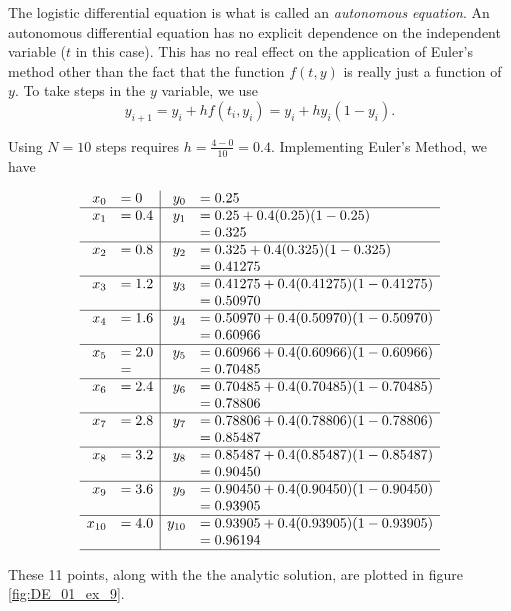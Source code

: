 {The logistic differential equation is what is called an \emph{autonomous equation}.  An autonomous differential equation  has no explicit dependence on the independent variable ($t$ in this case).  This has no real effect on the application of Euler's method other than the fact that the function $f(t,y)$ is really just a function of $y$.  To take steps in the $y$ variable, we use
\[y_{i+1} = y_i + hf(t_i,y_i) = y_i + hy_i(1-y_i).\]

Using $N=10$ steps requires $\displaystyle h = \frac{4-0}{10} = 0.4.$  Implementing Euler's Method, we have

\[
\begin{array}{rl | rl}
x_0  &= 0			& 	y_0	&= 0.25\\ \hline
x_1 	&= 0.4		&	y_1 	&= 0.25 + 0.4(0.25)(1-0.25)\\
	&			&		&= 0.325\\ \hline
x_2 	&= 0.8 		& 	y_2 	&= 0.325 + 0.4(0.325)(1-0.325)\\
	&			&		&= 0.41275\\ \hline
x_3	&= 1.2		&	y_3 	&= 0.41275 + 0.4(0.41275)(1-0.41275)\\
	&			&		&= 0.50970\\ \hline
x_4	&= 1.6		&	y_4	&= 0.50970 + 0.4(0.50970)(1 - 0.50970)\\
	&			&		&= 0.60966\\ \hline
x_5  &= 2.0		& 	y_5	&= 0.60966 + 0.4(0.60966)(1-0.60966)\\
	&=			&		&=  0.70485\\ \hline
x_6 	&= 2.4		&	y_6 	&= 0.70485 + 0.4(0.70485)(1 - 0.70485)\\
	&			&		&= 0.78806\\ \hline
x_7 	&= 2.8 		& 	y_7 	&= 0.78806 + 0.4(0.78806)(1-0.78806)\\
	&			&		&= 0.85487\\ \hline
x_8	&= 3.2		&	y_8 	&= 0.85487 + 0.4(0.85487)(1-0.85487)\\
	&			&		&= 0.90450\\ \hline
x_9	&= 3.6		&	y_9	&= 0.90450 + 0.4(0.90450)(1 - 0.90450)\\
	&			&		&= 0.93905\\ \hline
x_{10}&= 4.0		&	y_{10}&= 0.93905 + 0.4(0.93905)(1 - 0.93905)\\
	&			&		&= 0.96194\\ \hline
\end{array}
\]

These 11 points, along with the  the analytic solution, are plotted in figure \ref{fig:DE_01_ex_9}.
}\\

